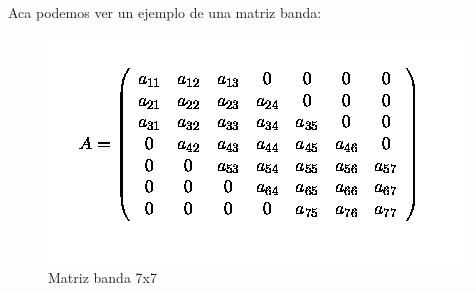 Aca podemos ver un ejemplo de una matriz banda:

\begin{figure}[htb]
\begin{center}
\includegraphics[scale=0.70]{imagenes/matriz_banda.jpg} 
\caption{Matriz banda 7x7} 
\end{center}
\end{figure}






